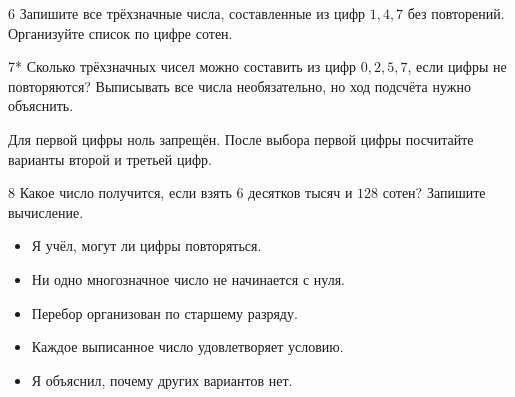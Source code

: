 \begin{homeworktask}{6}
  Запишите все трёхзначные числа, составленные из цифр \(1,4,7\) без
  повторений. Организуйте список по цифре сотен.
  \answerspace{28mm}
\end{homeworktask}

\begin{homeworktask}{7*}
  Сколько трёхзначных чисел можно составить из цифр \(0,2,5,7\), если цифры
  не повторяются? Выписывать все числа необязательно, но ход подсчёта нужно
  объяснить.

  \begin{hintbox}
    Для первой цифры ноль запрещён. После выбора первой цифры посчитайте
    варианты второй и третьей цифр.
  \end{hintbox}
  \answerspace{33mm}
\end{homeworktask}

\begin{homeworktask}{8}
  Какое число получится, если взять \(6\) десятков тысяч и \(128\) сотен?
  Запишите вычисление.
  \answerspace{22mm}
\end{homeworktask}

\begin{selfcheck}
  \begin{itemize}[label=\(\square\),leftmargin=1.7em,itemsep=0.25em,topsep=0.2em]
    \item Я учёл, могут ли цифры повторяться.
    \item Ни одно многозначное число не начинается с нуля.
    \item Перебор организован по старшему разряду.
    \item Каждое выписанное число удовлетворяет условию.
    \item Я объяснил, почему других вариантов нет.
  \end{itemize}
\end{selfcheck}

